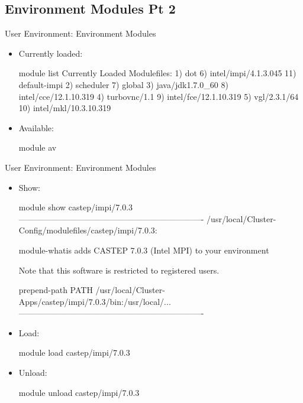 \subsection{Environment Modules Pt 2}
\begin{frame}[fragile]{User Environment: Environment Modules}
\begin{itemize}
\item{Currently loaded:}
\begin{semiverbatim}
\scriptsize
module list
Currently Loaded Modulefiles:
  1) dot                     6) intel/impi/4.1.3.045   11) default-impi
  2) scheduler               7) global                 
  3) java/jdk1.7.0_60        8) intel/cce/12.1.10.319  
  4) turbovnc/1.1            9) intel/fce/12.1.10.319  
  5) vgl/2.3.1/64           10) intel/mkl/10.3.10.319
\end{semiverbatim}
\medskip
\item{Available:}
\begin{semiverbatim}
\scriptsize
module av
\end{semiverbatim}
\end{itemize}
\end{frame}

\begin{frame}[fragile]{User Environment: Environment Modules}
\begin{itemize}
\item{Show:}
\begin{semiverbatim}
\tiny
module show castep/impi/7.0.3
-------------------------------------------------------------------
/usr/local/Cluster-Config/modulefiles/castep/impi/7.0.3:

module-whatis    adds CASTEP 7.0.3 (Intel MPI) to your environment 

Note that this software is restricted to registered users.

prepend-path     PATH /usr/local/Cluster-Apps/castep/impi/7.0.3/bin:/usr/local/...
-------------------------------------------------------------------
\end{semiverbatim}
\medskip
\item{Load:}
\begin{semiverbatim}
\scriptsize
module load castep/impi/7.0.3
\end{semiverbatim}
\medskip
\item{Unload:}
\begin{semiverbatim}
\scriptsize
module unload castep/impi/7.0.3
\end{semiverbatim}
\end{itemize}
\end{frame}

